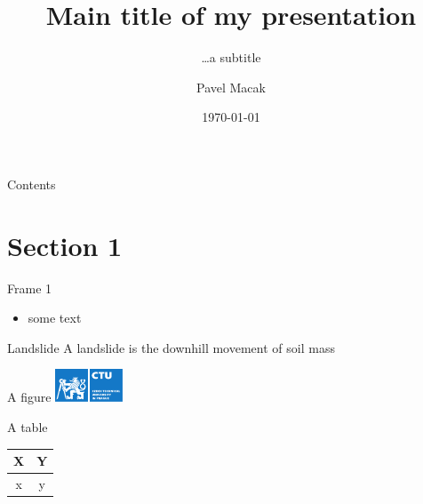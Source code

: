 \documentclass[]{beamer}
\title[Main title]{Main title of my presentation}
\subtitle{\ldots a subtitle}
\author[P.\ Macak]{Pavel Macak} %
\date{\today} %
\institute[CTU]{Faculty of Mechanical Engineering\\ Department of Mathematics}
\begin{document}
	
	{
		\maketitle
	}
	\addtocounter{framenumber}{-1} %
	
	\begin{frame}{Contents}
		\tableofcontents
	\end{frame}
	
	\section{Section 1}
	\begin{frame}{Frame 1}
		\begin{itemize}
			\item some text
			
		\end{itemize}
		\begin{ctublock}{Landslide}
			A landslide is the downhill movement of soil mass
		\end{ctublock}
	\end{frame}
	
	\begin{frame}{A figure}
		\centering
		\includegraphics[width=2cm]{files/logo_ctu.pdf}
	\end{frame}
	
	\begin{frame}{A table}
		\centering
		\begin{tabular}{|c|c|}
			\hline
			\bf X & \bf Y \\ \hline
			x & y \\ \hline 
		\end{tabular}
	\end{frame}
	
	
\end{document}
